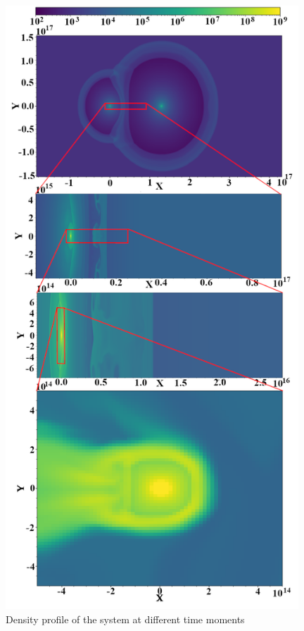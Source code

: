 \documentclass[a4paper,12pt]{extreport}
\begin{document}
\begin{figure}
	\centering
	\begin{minipage}{0.48\textwidth}
		\centering
		\includegraphics[width=0.98\textwidth]{./fig/density.png} 
		\caption{Density profile of the system at different time moments}

\end{minipage}
\end{figure}
\end{document}
